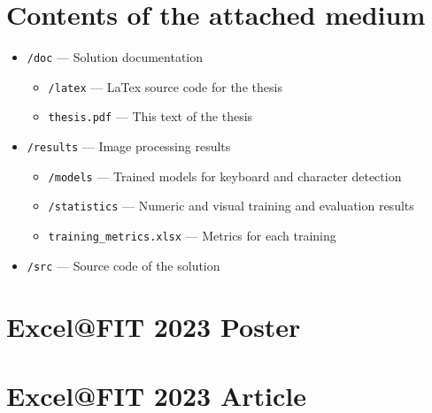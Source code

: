 \chapter{Contents of the attached medium}
\label{Appendix-A}

\begin{itemize}
  \item \texttt{/doc} --- Solution documentation
    \begin{itemize}
        \item \texttt{/latex} --- LaTex source code for the thesis
        \item \texttt{thesis.pdf} --- This text of the thesis
    \end{itemize}
  \item \texttt{/results} --- Image processing results
    \begin{itemize}
        \item \texttt{/models} --- Trained models for keyboard and character detection
        \item \texttt{/statistics} --- Numeric and visual training and evaluation results
        \item \texttt{training\_metrics.xlsx} --- Metrics for each training
    \end{itemize}
  \item \texttt{/src} --- Source code of the solution
\end{itemize}

\chapter{Excel@FIT 2023 Poster}


\chapter{Excel@FIT 2023 Article}


